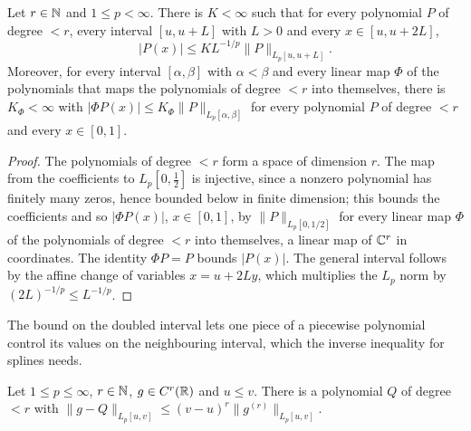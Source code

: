 \begin{lemma}
\label{lem:interval-nikolskii}
\leanok
Let $r \in \mathbb{N}$ and $1 \leq p < \infty$. There is $K < \infty$ such that for every polynomial $P$ of
degree $< r$, every interval $[u, u + L]$ with $L > 0$ and every $x \in [u, u + 2L]$,
\[
  |P(x)| \leq K L^{-1/p} \|P\|_{L_p[u, u + L]} .
\]
Moreover, for every interval $[\alpha, \beta]$ with $\alpha < \beta$ and every linear map $\Phi$
of the polynomials that maps the polynomials of degree $< r$ into themselves, there is
$K_\Phi < \infty$ with $|\Phi P(x)| \leq K_\Phi \|P\|_{L_p[\alpha, \beta]}$ for every polynomial
$P$ of degree $< r$ and every $x \in [0, 1]$.
\end{lemma}

\begin{proof}
\leanok
The polynomials of degree $< r$ form a space of dimension $r$. The map from the coefficients to
$L_p[0, \tfrac12]$ is injective, since a nonzero polynomial has finitely many zeros, hence bounded
below in finite dimension; this bounds the coefficients and so $|\Phi P(x)|$, $x \in [0, 1]$, by
$\|P\|_{L_p[0,1/2]}$ for every linear map $\Phi$ of the polynomials of degree $< r$ into
themselves, a linear map of $\mathbb{C}^r$ in coordinates. The identity $\Phi P = P$ bounds $|P(x)|$.
The general interval follows by the affine change of variables
$x = u + 2L y$, which multiplies the $L_p$ norm by $(2L)^{-1/p} \leq L^{-1/p}$.
\end{proof}

The bound on the doubled interval lets one piece of a piecewise polynomial control its values on
the neighbouring interval, which the inverse inequality for splines needs.

\begin{lemma}
\label{lem:taylor-lp}
\leanok
Let $1 \leq p \leq \infty$, $r \in \mathbb{N}$, $g \in C^r(\mathbb{R})$ and $u \leq v$. There is a polynomial $Q$
of degree $< r$ with
$\|g - Q\|_{L_p[u, v]} \leq (v - u)^r \|g^{(r)}\|_{L_p[u, v]}$.
\end{lemma}

